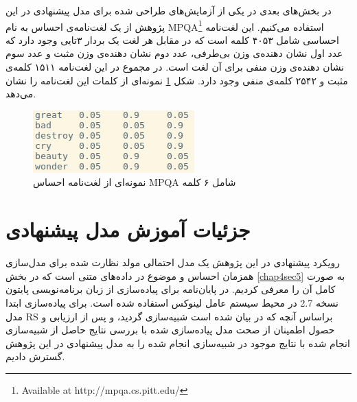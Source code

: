 در بخش‌های بعدی در یکی‌ از آزمایش‌های طراحی شده برای مدل پیشنهادی در این پژوهش از یک لغت‌نامه‌ی احساس به نام
MPQA\footnote{Available at http://mpqa.cs.pitt.edu/}
استفاده می‌‌کنیم. این لغت‌نامه احساسی‌ شامل ۴۰۵۳ کلمه است که در مقابل هر لغت یک بردار ۳تایی‌ وجود دارد که عدد اول نشان دهنده‌ی وزن بی‌طرفی، عدد دوم نشان دهنده‌ی وزن مثبت و عدد سوم نشان دهنده‌ی وزن منفی‌ برای آن لغت است. در مجموع در این لغت‌نامه ۱۵۱۱ کلمه‌ی مثبت و ۲۵۴۲ کلمه‌ی منفی‌ وجود دارد. شکل
\ref{chap5-fig2}
نمونه‌ای از کلمات این لغت‌نامه را نشان می‌‌دهد.
\begin{figure}[!b]
	\centering
	\includegraphics[scale=0.7]{chap5-img/lex-example}
	\caption{نمونه‌ای از لغت‌نامه احساس MPQA شامل ۶ کلمه}
	\label{chap5-fig2}
\end{figure}

\section{جزئیات آموزش مدل پیشنهادی}
\label{chap5sec6}
رويکرد پيشنهادی در اين پژوهش يک مدل احتمالی مولد نظارت شده برای مدل‌سازی همزمان احساس و موضوع در داده‌های متنی است که در بخش
\ref{chap4sec5}
به صورت کامل آن را معرفی کردیم. در پایان‌‌نامه برای پياده‌سازی از زبان برنامه‌نويسی پایتون نسخه 2.7 در محيط سيستم عامل لينوکس استفاده شده است. برای پیاده‌سازی ابتدا مدل 
RS
براساس آنچه که در 
\cite{hinton2009replicated}
بيان شده است شبيه‌سازی گرديد، و پس از ارزیابی  و حصول اطمینان از صحت مدل پياده‌سازی شده با بررسی نتايج حاصل از شبيه‌سازی انجام شده با نتايج موجود در 
\cite{hinton2009replicated}
شبيه‌سازی انجام شده را به مدل پيشنهادی در اين پژوهش گسترش داديم.

